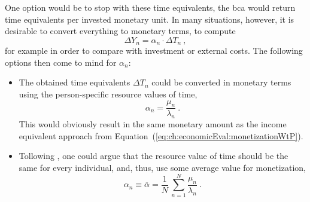 One option would be to stop with these time equivalents, \ie the \gls{bca} would return time equivalents per invested monetary unit.  
%
In many situations, however, it is desirable to convert everything to monetary terms, \ie to compute
\begin{equation}
\Delta Y_n = \alpha_n \cdot \Delta T_n \ ,
\label{eq:ch:economicEval:monetizationTime2Money}
\end{equation}
for example in order to compare with investment or external costs.  The following options then come to mind for $\alpha_n$:
\begin{itemize}\styleItemize

\item
The obtained time equivalents $\Delta T_n$ could be converted in monetary terms using the person-specific resource values of time, \ie
\begin{equation}
\alpha_n = \frac{\mu_n}{\lambda_n} \ .
\label{eq:time2money-by-resource-VoT}
\end{equation}
%
This would obviously result in the same monetary amount as the income equivalent approach from Equation~(\ref{eq:ch:economicEval:monetizationWtP}). 
%
%

\item
Tollowing \citet{MackieWorsley2013ComparisonTransportAppraisal}, one could argue that 
the resource value of time should be the same for every individual,
and, thus, use some average 
value for monetization, \eg 
\[
\alpha_n \equiv \overline\alpha = \frac{1}{N} \, \sum_{n=1}^N \frac{\mu_n}{\lambda_n} \ .
\]


\end{itemize}
